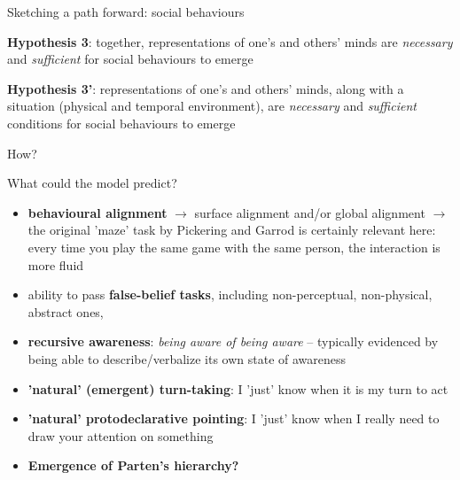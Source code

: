 \documentclass[compress]{beamer}
\begin{document}
\begin{frame}{Sketching a path forward: social behaviours}

    {\bf Hypothesis 3}: together, representations of one's and others' minds are
    \emph{necessary} and \emph{sufficient} for social behaviours to emerge

    {\bf Hypothesis 3'}: representations of one's and others' minds, along with
    a situation (physical and temporal environment), are \emph{necessary} and
    \emph{sufficient} conditions for social behaviours to emerge

    \pause

    How?


\end{frame}

\begin{frame}{What could the model predict?}

    \begin{itemize}

        \item {\bf behavioural alignment} $\rightarrow$ surface alignment and/or
            global alignment $\rightarrow$ the original 'maze' task by Pickering
            and Garrod is certainly relevant here: every time you play the same
            game with the same person, the interaction is more fluid

        \item ability to pass {\bf false-belief tasks}, including
            non-perceptual, non-physical, abstract ones,

        \item {\bf recursive awareness}: \emph{being aware of being aware} -- typically
            evidenced by being able to describe/verbalize its own state of
            awareness 

        \item {\bf 'natural' (\ie emergent) turn-taking}: I 'just' know when it is my
            turn to act

        \item {\bf 'natural' protodeclarative pointing}: I 'just' know when I really
            need to draw your attention on something

        \item {\bf Emergence of Parten's hierarchy?}

    \end{itemize}

\end{frame}
\end{document}
